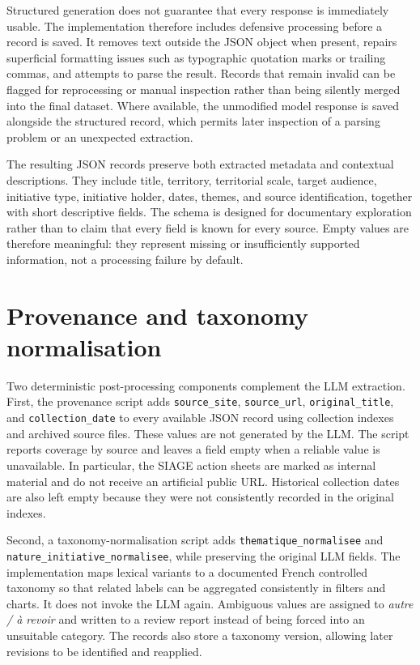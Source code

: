 \documentclass[
11pt,
english,
singlespacing,
headsepline,
]{MastersDoctoralThesis}
\begin{document}
Structured generation does not guarantee that every response is immediately
usable. The implementation therefore includes defensive processing before a
record is saved. It removes text outside the JSON object when present, repairs
superficial formatting issues such as typographic quotation marks or trailing
commas, and attempts to parse the result. Records that remain invalid can be
flagged for reprocessing or manual inspection rather than being silently merged
into the final dataset. Where available, the unmodified model response is saved
alongside the structured record, which permits later inspection of a parsing
problem or an unexpected extraction.

The resulting JSON records preserve both extracted metadata and contextual
descriptions. They include title, territory, territorial scale, target
audience, initiative type, initiative holder, dates, themes, and source
identification, together with short descriptive fields. The schema is designed
for documentary exploration rather than to claim that every field is known for
every source. Empty values are therefore meaningful: they represent missing or
insufficiently supported information, not a processing failure by default.

\section{Provenance and taxonomy normalisation}

Two deterministic post-processing components complement the LLM extraction.
First, the provenance script adds \texttt{source\_site}, \texttt{source\_url},
\texttt{original\_title}, and \texttt{collection\_date} to every available JSON
record using collection indexes and archived source files. These values are not
generated by the LLM. The script reports coverage by source and leaves a field
empty when a reliable value is unavailable. In particular, the SIAGE action
sheets are marked as internal material and do not receive an artificial public
URL. Historical collection dates are also left empty because they were not
consistently recorded in the original indexes.

Second, a taxonomy-normalisation script adds
\texttt{thematique\_normalisee} and
\texttt{nature\_initiative\_normalisee}, while preserving the original LLM
fields. The implementation maps lexical variants to a documented French
controlled taxonomy so that related labels can be aggregated consistently in
filters and charts. It does not invoke the LLM again. Ambiguous values are
assigned to \textit{autre / à revoir} and written to a review report instead of
being forced into an unsuitable category. The records also store a taxonomy
version, allowing later revisions to be identified and reapplied.
\end{document}
